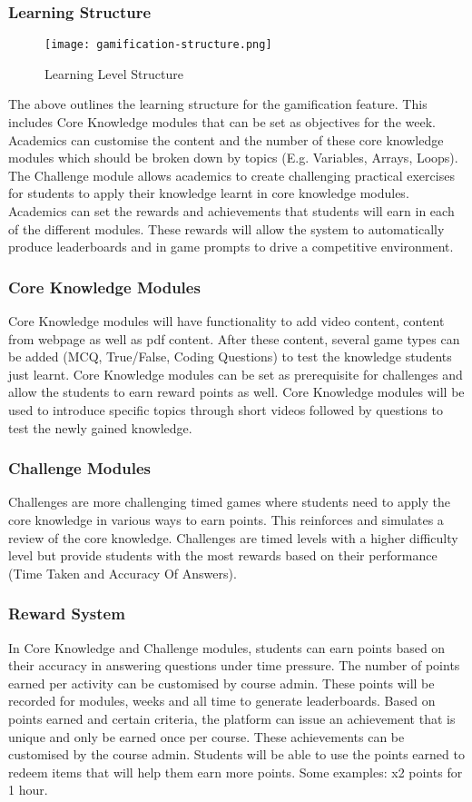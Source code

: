 \subsubsection{Learning Structure}
\begin{figure}[h!]
    \texttt{[image: gamification-structure.png]}
    \centering
    \caption{Learning Level Structure}
\end{figure}

The above outlines the learning structure for the gamification feature. This includes Core Knowledge modules that can be set as objectives for the week. Academics can customise the content and the number of these core knowledge modules which should be broken down by topics (E.g. Variables, Arrays, Loops). The Challenge module allows academics to create challenging practical exercises for students to apply their knowledge learnt in core knowledge modules. Academics can set the rewards and achievements that students will earn in each of the different modules. These rewards will allow the system to automatically produce leaderboards and in game prompts to drive a competitive environment.

\subsubsection{Core Knowledge Modules}
Core Knowledge modules will have functionality to add video content, content from webpage as well as pdf content. After these content, several game types can be added (MCQ, True/False, Coding Questions) to test the knowledge students just learnt. Core Knowledge modules can be set as prerequisite for challenges and allow the students to earn reward points as well. Core Knowledge modules will be used to introduce specific topics through short videos followed by questions to test the newly gained knowledge. 

\subsubsection{Challenge Modules}
Challenges are more challenging timed games where students need to apply the core knowledge in various ways to earn points. This reinforces and simulates a review of the core knowledge. Challenges are timed levels with a higher difficulty level but provide students with the most rewards based on their performance (Time Taken and Accuracy Of Answers).

\subsubsection{Reward System}
In Core Knowledge and Challenge modules, students can earn points based on their accuracy in answering questions under time pressure. The number of points earned per activity can be customised by course admin. These points will be recorded for modules, weeks and all time to generate leaderboards. Based on points earned and certain criteria, the platform can issue an achievement that is unique and only be earned once per course. These achievements can be customised by the course admin. Students will be able to use the points earned to redeem items that will help them earn more points. Some examples: x2 points for 1 hour. 

